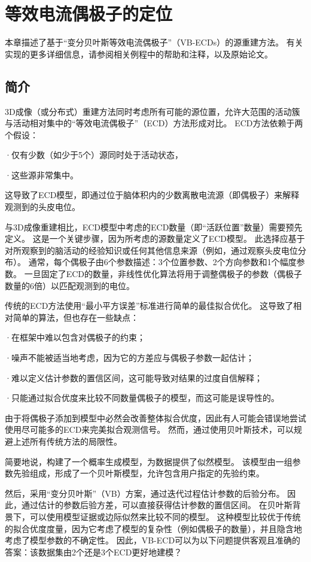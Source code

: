 \chapter{等效电流偶极子的定位}

本章描述了基于“变分贝叶斯等效电流偶极子”（VB-ECDs）的源重建方法。
有关实现的更多详细信息，请参阅相关例程中的帮助和注释，以及原始论文。


\section{简介}

3D成像（或分布式）重建方法同时考虑所有可能的源位置，允许大范围的活动簇与活动相对集中的“等效电流偶极子”（ECD）方法形成对比。
ECD方法依赖于两个假设：

·仅有少数（如少于5个）源同时处于活动状态，

·这些源非常集中。

这导致了ECD模型，即通过位于脑体积内的少数离散电流源（即偶极子）来解释观测到的头皮电位。

与3D成像重建相比，ECD模型中考虑的ECD数量（即“活跃位置”数量）需要预先定义。
这是一个关键步骤，因为所考虑的源数量定义了ECD模型。
此选择应基于对所观察到的脑活动的经验知识或任何其他信息来源（例如，通过观察头皮电位分布）。
通常，每个偶极子由6个参数描述：3个位置参数、2个方向参数和1个幅度参数。
一旦固定了ECD的数量，非线性优化算法将用于调整偶极子的参数（偶极子数量的6倍）以匹配观测到的电位。

传统的ECD方法使用“最小平方误差”标准进行简单的最佳拟合优化。
这导致了相对简单的算法，但也存在一些缺点：

·在框架中难以包含对偶极子的约束；

·噪声不能被适当地考虑，因为它的方差应与偶极子参数一起估计；

·难以定义估计参数的置信区间，这可能导致对结果的过度自信解释；

·只能通过拟合优度来比较不同数量偶极子的模型，而这可能是误导性的。

由于将偶极子添加到模型中必然会改善整体拟合优度，因此有人可能会错误地尝试使用尽可能多的ECD来完美拟合观测信号。
然而，通过使用贝叶斯技术，可以规避上述所有传统方法的局限性。

简要地说，构建了一个概率生成模型，为数据提供了似然模型。
该模型由一组参数先验组成，形成了一个贝叶斯模型，允许包含用户指定的先验约束。

然后，采用“变分贝叶斯”（VB）方案，通过迭代过程估计参数的后验分布。
因此，通过估计的参数后验方差，可以直接获得估计参数的置信区间。
在贝叶斯背景下，可以使用模型证据或边际似然来比较不同的模型。
这种模型比较优于传统的拟合优度度量，因为它考虑了模型的复杂性（例如偶极子的数量），并且隐含地考虑了模型参数的不确定性。
因此，VB-ECD可以为以下问题提供客观且准确的答案：该数据集由2个还是3个ECD更好地建模？



